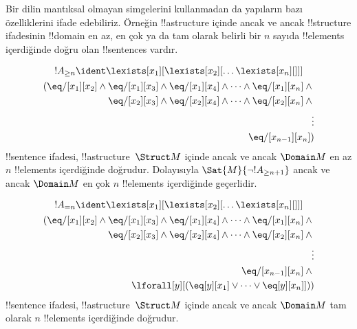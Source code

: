 



\begin{explain}
Bir dilin mantıksal olmayan simgelerini kullanmadan da yapıların bazı
özelliklerini ifade edebiliriz. Örneğin !!a{structure} içinde ancak ve
ancak !!{structure} ifadesinin !!{domain} en az, en çok ya da tam
olarak belirli bir $n$ sayıda !!{element}s içerdiğinde doğru olan
!!{sentence}s vardır.
\end{explain}

\begin{prop}
\begin{multline*}
  !A_{\ge n} \ident \lexists[x_1][\lexists[x_2][\dots\lexists[x_n][{}]]]\\
  \begin{aligned}
  (\eq/[x_1][x_2] \land {}
  \eq/[x_1][x_3] \land \eq/[x_1][x_4] \land \dots \land \eq/[x_1][x_n] \land {}\\
\eq/[x_2][x_3] \land \eq/[x_2][x_4] \land \dots \land {} \eq/[x_2][x_n] \land {} \\
\vdots\\
\eq/[x_{n-1}][x_n])
\end{aligned}
\end{multline*}
!!{sentence} ifadesi, !!a{structure}~$\Struct M$ içinde ancak ve ancak
$\Domain M$ en az $n$ !!{element}s içerdiğinde doğrudur. Dolayısıyla
$\Sat{M}{\lnot !A_{\ge n+1}}$ ancak ve ancak $\Domain M$ en çok $n$
!!{element}s içerdiğinde geçerlidir.
\end{prop}

\begin{prop}
\begin{multline*}
!A_{= n} \ident \lexists[x_1][\lexists[x_2][\dots\lexists[x_n][{}]]] \\
\begin{aligned}
  (\eq/[x_1][x_2] \land {}
  \eq/[x_1][x_3] \land \eq/[x_1][x_4] \land \dots \land \eq/[x_1][x_n] \land {}\\
\eq/[x_2][x_3] \land \eq/[x_2][x_4] \land \dots \land {} \eq/[x_2][x_n] \land {} \\
\vdots\\
\eq/[x_{n-1}][x_n] \land {} \\
\lforall[y][(\eq[y][x_1] \lor \dots \lor \eq[y][x_n]]))
\end{aligned}
\end{multline*}
!!{sentence} ifadesi, !!a{structure}~$\Struct M$ içinde ancak ve ancak
$\Domain M$ tam olarak $n$ !!{element}s içerdiğinde doğrudur.
\end{prop}

